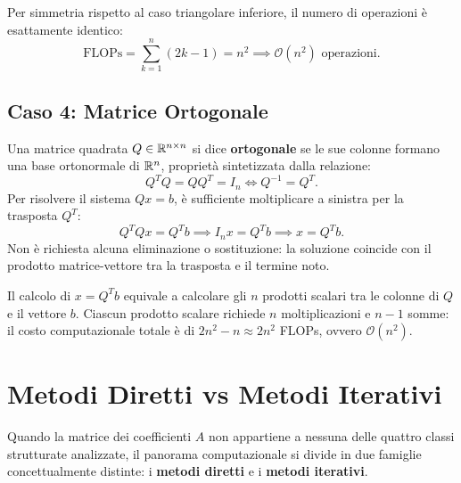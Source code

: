 Per simmetria rispetto al caso triangolare inferiore, il numero di operazioni \`e esattamente identico:
\begin{equation}
    \text{FLOPs} = \sum_{k=1}^n (2k - 1) = n^2 \implies \mathcal{O}(n^2) \text{ operazioni.}
\end{equation}

\subsection{Caso 4: Matrice Ortogonale}
Una matrice quadrata $Q \in \mathbb{R}^{n \times n}$ si dice \textbf{ortogonale} se le sue colonne formano una base ortonormale di $\mathbb{R}^n$, propriet\`a sintetizzata dalla relazione:
\begin{equation}
    Q^T Q = Q Q^T = I_n \iff Q^{-1} = Q^T.
\end{equation}
Per risolvere il sistema $Qx = b$, \`e sufficiente moltiplicare a sinistra per la trasposta $Q^T$:
\begin{equation}
    Q^T Q x = Q^T b \implies I_n x = Q^T b \implies x = Q^T b.
\end{equation}
Non \`e richiesta alcuna eliminazione o sostituzione: la soluzione coincide con il prodotto matrice-vettore tra la trasposta e il termine noto.
\begin{property}
Il calcolo di $x = Q^T b$ equivale a calcolare gli $n$ prodotti scalari tra le colonne di $Q$ e il vettore $b$. Ciascun prodotto scalare richiede $n$ moltiplicazioni e $n-1$ somme: il costo computazionale totale \`e di $2n^2 - n \approx 2n^2$ FLOPs, ovvero $\mathcal{O}(n^2)$.
\end{property}

\FloatBarrier
\section{Metodi Diretti vs Metodi Iterativi}
\label{sec:diretti-vs-iterativi}

Quando la matrice dei coefficienti $A$ non appartiene a nessuna delle quattro classi strutturate analizzate, il panorama computazionale si divide in due famiglie concettualmente distinte: i \textbf{metodi diretti} e i \textbf{metodi iterativi}.


